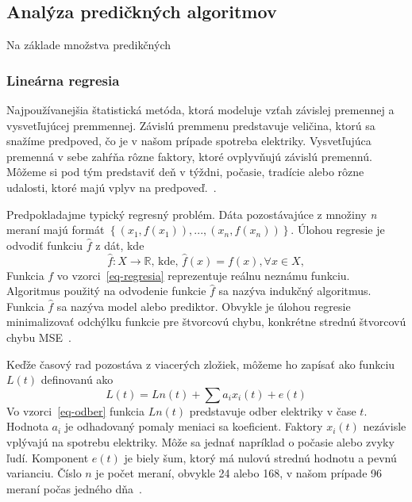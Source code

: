 \documentclass[a4paper,slovak,12pt,appendix]{article}
\begin{document}

\subsection{Analýza predičkných algoritmov}
Na základe množstva predikčných


\subsubsection{Lineárna regresia}
Najpoužívanejšia štatistická metóda, ktorá modeluje vzťah závislej premennej
a vysvetľujúcej premmennej. Závislú premmenu predstavuje veličina, ktorú sa
snažíme predpoved, čo je v našom prípade spotreba elektriky. Vysvetľujúca
premenná v sebe zahŕňa rôzne faktory, ktoré ovplyvňujú závislú premennú.
Môžeme si pod tým predstaviť deň v týždni, počasie, tradície alebo rôzne
udalosti, ktoré majú vplyv na predpoveď.~\cite{KumarSingh2013}.

Predpokladajme typický regresný problém. Dáta pozostávajúce z množiny \textit{n}
meraní majú formát $\left\{(x_1, f(x_1)), ..., (x_n, f(x_n))\right\}$.
Úlohou regresie je odvodiť funkciu $\hat{f}$ z dát, kde
\begin{equation}
  \hat{f} : X \to \mathbb{R} \text{, kde, } \hat{f}(x) = f(x), \forall x \in X,
  \label{eq-regresia}
\end{equation}
Funkcia $f$ vo vzorci~\ref{eq-regresia} reprezentuje reálnu neznámu
funkciu. Algoritmus použitý na odvodenie funkcie $\hat{f}$ sa nazýva
indukčný algoritmus. Funkcia $\hat{f}$ sa nazýva model alebo
prediktor. Obvykle je úlohou regresie minimalizovať odchýlku funkcie pre
štvorcovú chybu, konkrétne strednú štvorcovú chybu MSE~\cite{Mendes-Moreira2012}.

Keďže časový rad pozostáva z viacerých zložiek, môžeme ho zapísať ako funkciu
$L(t)$ definovanú ako
\begin{equation}
  L(t) = Ln(t) + \sum a_i x_i(t) + e(t)
  \label{eq-odber}
\end{equation}
Vo vzorci~\ref{eq-odber} funkcia $Ln(t)$ predstavuje odber elektriky v čase
$t$. Hodnota $a_i$ je odhadovaný pomaly meniaci sa koeficient. Faktory
$x_i(t)$ nezávisle vplývajú na spotrebu elektriky. Môže sa jednať napríklad
o počasie alebo zvyky ľudí. Komponent $e(t)$ je biely šum, ktorý má nulovú
strednú hodnotu a pevnú varianciu. Číslo $n$ je počet meraní, obvykle 24
alebo 168, v našom prípade 96 meraní počas jedného dňa~\cite{KumarSingh2013}.
\end{document}
